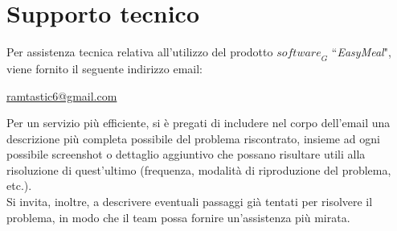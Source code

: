 \section{Supporto tecnico}
Per assistenza tecnica relativa all'utilizzo del prodotto $\textit{software}_G$ “\textit{EasyMeal}", viene fornito il seguente indirizzo email: 
\begin{center}
    \href{mailto:ramtastic6@gmail.com}{ramtastic6@gmail.com}
\end{center}
Per un servizio più efficiente, si è pregati di includere nel corpo dell'email una descrizione più completa possibile del problema riscontrato, insieme ad ogni possibile screenshot o dettaglio aggiuntivo che possano risultare utili alla risoluzione di quest'ultimo (frequenza, modalità di riproduzione del problema, etc.). \\
Si invita, inoltre, a descrivere eventuali passaggi già tentati per risolvere il problema, in modo che il team possa fornire un'assistenza più mirata.